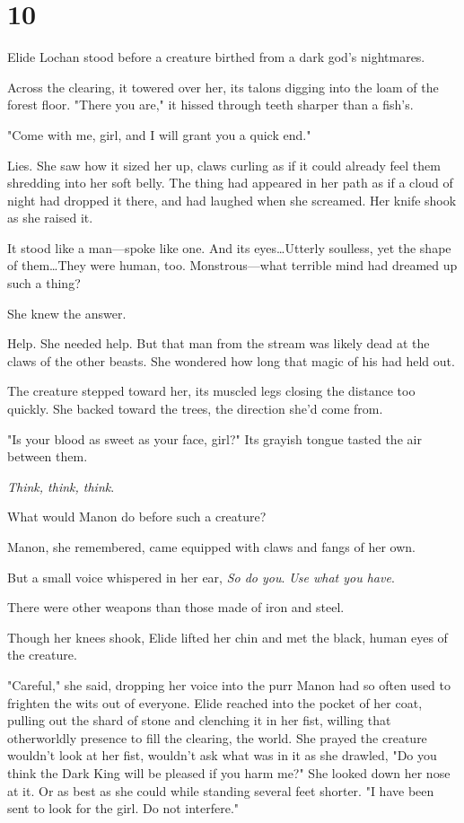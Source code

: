 
\chapter{10}

Elide Lochan stood before a creature birthed from a dark god's nightmares.

Across the clearing, it towered over her, its talons digging into the loam of the forest floor.
"There you are," it hissed through teeth sharper than a fish's.

"Come with me, girl, and I will grant you a quick end."

Lies.
She saw how it sized her up, claws curling as if it could already feel them shredding into her soft belly.
The thing had appeared in her path as if a cloud of night had dropped it there, and had laughed when she screamed.
Her knife shook as she raised it.

It stood like a man---spoke like one.
And its eyes\ldots Utterly soulless, yet the shape of them\ldots They were human, too.
Monstrous---what terrible mind had dreamed up such a thing?

She knew the answer.

Help.
She needed help.
But that man from the stream was likely dead at the claws of the other beasts.
She wondered how long that magic of his had held out.

The creature stepped toward her, its muscled legs closing the distance too quickly.
She backed toward the trees, the direction she'd come from.

"Is your blood as sweet as your face, girl?"
Its grayish tongue tasted the air between them.

\emph{Think, think, think}.

What would Manon do before such a creature?

Manon, she remembered, came equipped with claws and fangs of her own.

But a small voice whispered in her ear, \emph{So do you}.
\emph{Use what you have}.

There were other weapons than those made of iron and steel.

Though her knees shook, Elide lifted her chin and met the black, human eyes of the creature.

"Careful," she said, dropping her voice into the purr Manon had so often used to frighten the wits out of everyone.
Elide reached into the pocket of her coat, pulling out the shard of stone and clenching it in her fist, willing that otherworldly presence to fill the clearing, the world.
She prayed the creature wouldn't look at her fist, wouldn't ask what was in it as she drawled, "Do you think the Dark King will be pleased if you harm me?"
She looked down her nose at it.
Or as best as she could while standing several feet shorter.
"I have been sent to look for the girl.
Do not interfere."

